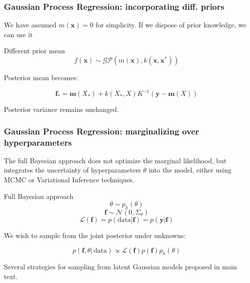 \documentclass[10pt]{beamer}
\begin{document}
		\begin{frame}
			\frametitle{Gaussian Process Regression: incorporating diff. priors}
			We have assumed $m(\boldsymbol{x}) = 0$ for simplicity. If we dispose of prior knowledge, we can use it
			
			\begin{block}{Different prior mean}
				\begin{equation}
				f(\boldsymbol{x}) \sim \mathcal{G}\mathcal{P}\left(m(\boldsymbol{x}), k(\boldsymbol{x}, \boldsymbol{x^*})\right)
				\end{equation}
				
				Posterior mean becomes:
				
				\begin{equation}
				\boldsymbol{f}_* = \boldsymbol{m}(X_*) + k(X_*, X)K^{-1}\left(\boldsymbol{y} - \boldsymbol{m}(X)\right) 
				\end{equation}
				
				Posterior variance remains unchanged.
			\end{block}
		\end{frame}
		
		\begin{frame}
			\frametitle{Gaussian Process Regression: marginalizing over hyperparameters}
			The full Bayesian approach does not optimize the marginal likelihood, but integrates the uncertainty of hyperparameters $\theta$ into the model, either using MCMC or Variational Inference techniques.
			
			\begin{block}{Full Bayesian approach}
				\begin{equation}
				\theta \sim p_{h}(\theta)
				\end{equation}
				\begin{equation}
				\boldsymbol{f} \sim \mathcal{N}(0, \Sigma_\theta)
				\end{equation}
				\begin{equation}
				\mathcal{L(\boldsymbol{f})} = p(\mathrm{data}|\boldsymbol{f}) = p(\boldsymbol{y}|\boldsymbol{f})
				\end{equation}
				
				We wish to sample from the joint posterior under unknowns:
				
				\begin{equation}
				p(\boldsymbol{f}, \theta|\, \mathrm{data}) \propto \mathcal{L}(\boldsymbol{f})p(\boldsymbol{f}) p_h(\theta)
				\end{equation}
			\end{block}
			Several strategies for sampling from latent Gaussian models proposed in main text.	
		\end{frame}
		
\end{document}
